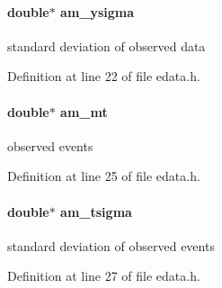 \hypertarget{struct_exp_data_af29a27d415ab3b3f165e86473412baad}{}
\paragraph[{am\+\_\+ysigma}]{\setlength{\rightskip}{0pt plus 5cm}double$\ast$ am\+\_\+ysigma}\label{struct_exp_data_af29a27d415ab3b3f165e86473412baad}
standard deviation of observed data 

Definition at line 22 of file edata.\+h.

\hypertarget{struct_exp_data_a44a8bb7cd806b8892c6ebff4d0bc75d4}{}
\paragraph[{am\+\_\+mt}]{\setlength{\rightskip}{0pt plus 5cm}double$\ast$ am\+\_\+mt}\label{struct_exp_data_a44a8bb7cd806b8892c6ebff4d0bc75d4}
observed events 

Definition at line 25 of file edata.\+h.

\hypertarget{struct_exp_data_a4d3759d9bc2651d74857d8801f8600cf}{}
\paragraph[{am\+\_\+tsigma}]{\setlength{\rightskip}{0pt plus 5cm}double$\ast$ am\+\_\+tsigma}\label{struct_exp_data_a4d3759d9bc2651d74857d8801f8600cf}
standard deviation of observed events 

Definition at line 27 of file edata.\+h.

